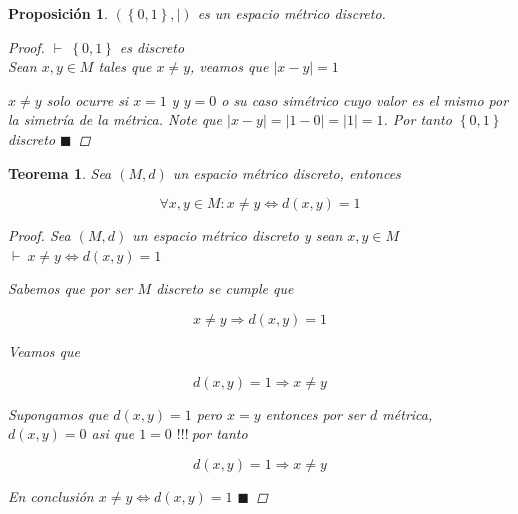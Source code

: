 \documentclass[oneside]{book} %
\theoremstyle{Teorema}
\newtheorem{Teorema}[Definicion]{Teorema}
\newtheorem{Proposicion}[Definicion]{Proposición}
\theoremstyle{Ejemplos}
\theoremstyle{[Obs]}
\newcommand{\abs}[1]{\left|#1\right|} %
\newcommand{\absSymbol}{\left|\right.} %
\renewcommand{\{}{\left\lbrace} %
\renewcommand{\}}{\right\rbrace} %
\renewcommand{\qed}{$\blacksquare$} %
\newcommand{\pd}{$\vdash\ $} %
\renewcommand{\c}{$!!!\ $} %
\begin{document}
			\begin{Proposicion}\setlength{\parindent}{0em}

				$(\{ 0, 1 \}, \absSymbol)$ es un espacio métrico discreto. 

				\begin{proof}
					
					\pd $\{ 0, 1 \}$ es discreto \\
					Sean $x, y \in M$ tales que $x \neq y$, veamos que $\abs{x - y} = 1$

					$x \neq y$ solo ocurre si $x = 1$ y $y = 0$ o su caso simétrico cuyo valor es el mismo por la simetría de la métrica. Note que $\abs{x - y} = \abs{1 - 0} = \abs{1} = 1$. Por tanto $\{ 0, 1 \}$ discreto \qed

				\end{proof}

			\end{Proposicion}

			\begin{Teorema}\setlength{\parindent}{0em}
			
				Sea $(M, d)$ un espacio métrico discreto, entonces 

				\[ \forall x, y \in M : x \neq y \Leftrightarrow d(x, y) = 1 \]

				\begin{proof}
					
					Sea $(M, d)$ un espacio métrico discreto y sean $x, y \in M$ \\ 
					\pd $x \neq y \Leftrightarrow d(x, y) = 1$ 

					Sabemos que por ser $M$ discreto se cumple que

					\[ x \neq y \Rightarrow d(x, y) = 1 \]

					Veamos que 

					\[ d(x, y) = 1 \Rightarrow x \neq y \]

					Supongamos que $d(x, y) = 1$ pero $x = y$ entonces por ser $d$ métrica, $d(x, y) = 0$ asi que $1 = 0$ \c por tanto 

					\[ d(x, y) = 1 \Rightarrow x \neq y \]

					En conclusión $x \neq y \Leftrightarrow d(x, y) = 1$ \qed

				\end{proof}
			
			\end{Teorema}
\end{document}
